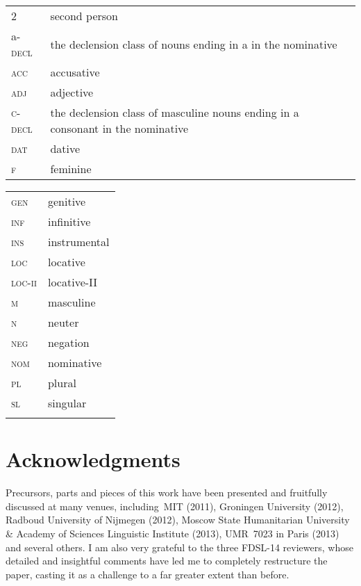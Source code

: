 \documentclass[output=paper,colorlinks,citecolor=brown]{langscibook}
\begin{document}
\begin{tabularx}{.5\textwidth}[t]{@{}lQ}
\textsc{2}&second person\\
a-\textsc{decl}&the declension class of nouns ending in a in the nominative\\
\textsc{acc}&accusative\\
\textsc{adj}&adjective\\
\textsc{c-decl}& the declension class of masculine nouns ending in a consonant in the nominative\\
\textsc{dat}&dative\\
\textsc{f}&feminine\\
\end{tabularx}%
\begin{tabularx}{.5\textwidth}[t]{lQ@{}}
\textsc{gen}&genitive\\
\textsc{inf}&infinitive\\
\textsc{ins}&instrumental\\
\textsc{loc}&locative\\
\textsc{loc-ii}&locative-II\\
\textsc{m}&masculine\\
\textsc{n}&neuter\\
\textsc{neg}&negation\\
\textsc{nom}&nominative\\
\textsc{pl}&plural\\
\textsc{sl}&singular\\
&\\ %
\end{tabularx}

\section*{Acknowledgments}
Precursors, parts and pieces of this work have been presented and fruitfully discussed at many venues, including~MIT (2011), Groningen University (2012), Radboud University of Nijmegen (2012), Moscow State Humanitarian University \& Academy of Sciences Linguistic Institute (2013), UMR~7023 in Paris (2013) and several others. I am also very grateful to the three FDSL-14 reviewers, whose detailed and insightful comments have led me to completely restructure the paper, casting it as a challenge to a far greater extent than before.

\printbibliography[heading=subbibliography,notkeyword=this]
\end{document}
